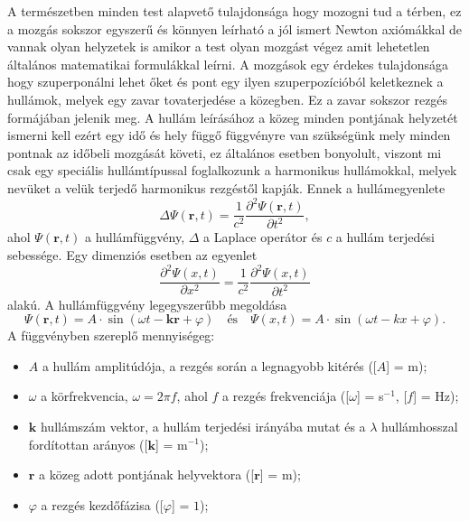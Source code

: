 \documentclass[a4paper,12pt]{article}
\newcommand{\V}[1]{\mathbf{#1}}
\begin{document}
A természetben minden test alapvető tulajdonsága hogy mozogni tud a térben, ez a mozgás sokszor egyszerű és könnyen leírható a jól ismert Newton axiómákkal de vannak olyan helyzetek is amikor a test olyan mozgást végez amit lehetetlen általános matematikai formulákkal leírni. A mozgások egy érdekes tulajdonsága hogy szuperponálni lehet őket és pont egy  ilyen szuperpozícióból keletkeznek a hullámok, melyek egy zavar tovaterjedése a közegben. Ez a zavar sokszor rezgés formájában jelenik meg. A hullám leírásához a közeg minden pontjának helyzetét ismerni kell ezért egy idő és hely függő függvényre van szükségünk mely minden pontnak az időbeli mozgását követi, ez általános esetben bonyolult, viszont mi csak egy speciális hullámtípussal foglalkozunk a harmonikus hullámokkal, melyek nevüket a velük terjedő harmonikus rezgéstől kapják. Ennek a hullámegyenlete
\begin{equation}
\Delta \Psi(\V{r}, t) = \frac{1}{c^2} \frac{\partial^2 \Psi(\V{r}, t)}{\partial t^2},
\label{hullamegyenlet-3D}
\end{equation}
ahol $\Psi(\V{r}, t)$ a hullámfüggvény, $\Delta$ a Laplace operátor és $c$ a hullám terjedési sebessége. Egy dimenziós esetben az egyenlet
\begin{equation}
\frac{\partial^2 \Psi(x, t)}{\partial x^2} = \frac{1}{c^2} \frac{\partial^2 \Psi(x, t)}{\partial t^2}
\label{hullamegyenlet-1D}
\end{equation}
alakú. A hullámfüggvény legegyszerűbb megoldása
$$ \Psi (\V{r}, t) = A \cdot \sin (\omega t - \V{k} \V{r} + \varphi) \quad \text{és} \quad \Psi(x, t) = A \cdot \sin(\omega t - k x + \varphi). $$
A függvényben szereplő mennyiségeg:
\begin{itemize}
\item $A$ a hullám amplitúdója, a rezgés során a legnagyobb kitérés ([$A$] = m);
\item $\omega$ a körfrekvencia, $\omega = 2 \pi f$, ahol $f$ a rezgés frekvenciája ([$\omega$] = s$^{-1}$, [$f$] = Hz);
\item $\V{k}$ hullámszám vektor, a hullám terjedési irányába mutat és a $\lambda$ hullámhosszal fordítottan arányos ([$\V{k}$] = m$^{-1}$);
\item $\V{r}$ a közeg adott pontjának helyvektora ([$\V{r}$] = m);
\item $\varphi$ a rezgés kezdőfázisa ([$\varphi$] = $1$);
\end{itemize}
\end{document}
